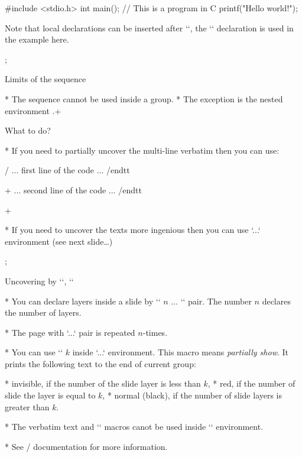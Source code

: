 \begtt {}
#include <stdio.h>
int main(); // This is a program in C
{
  printf("Hello world!\n");
}
\endtt

Note that local declarations can be inserted after `\begtt`,\nl
the `\hisyntax` declaration is used in the example here.

\pg; %

\sec Limits of the \code{\\pg+} sequence

* The \code{\\pg+} sequence cannot be used inside a group.
* The exception is the nested environment .\pg+

\secc What to do?

* If you need to partially uncover the multi-line verbatim\nl
  then you can use:

\begtt \adef/{\bslash}
\begtt
... first line of the code ...
/endtt 
\par\pg+ \vskip-6.75pt
\begtt
... second line of the code ...
/endtt
\endtt

\pg+


* If you need to uncover the texts more ingenious then you can
  use `\layers...\endlayers` environment (see next slide\dots)

\pg; %

\sec Uncovering by `\layers`, `\pshow`

* You can declare layers inside a slide by `\layers` $n$ ... `\endlayers` pair.
  The number $n$ declares the number of layers.

* The page with `\layers...\endlayers` pair is repeated $n$-times.

* You can use `\pshow` $k$ inside `\layers...\endlayers` environment.\nl
  This macro means {\em partially show}. It prints the following text to the end
  of current group:

\begitems
* invisible, if the number of the slide layer is less than $k$,
* red, if the number of slide the layer is equal to $k$,
* normal (black), if the number of slide layers is greater than $k$. 
\enditems

* The verbatim text and `\secc` macros canot be used inside 
  `\layer` environment.

* See \OpTeX/ documentation for more information.

